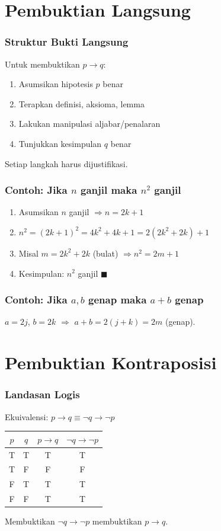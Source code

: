 \documentclass[handout]{beamer}
\theoremstyle{definition}
\theoremstyle{example}
\begin{document}
\section{Pembuktian Langsung}

\begin{frame}
\frametitle{Struktur Bukti Langsung}
Untuk membuktikan $p \to q$:
\begin{enumerate}
  \item Asumsikan hipotesis $p$ benar
  \item Terapkan definisi, aksioma, lemma
  \item Lakukan manipulasi aljabar/penalaran
  \item Tunjukkan kesimpulan $q$ benar
\end{enumerate}
Setiap langkah harus dijustifikasi.
\end{frame}

\begin{frame}
\frametitle{Contoh: Jika $n$ ganjil maka $n^2$ ganjil}
\begin{enumerate}
  \item Asumsikan $n$ ganjil $\Rightarrow n = 2k + 1$
  \item $n^2 = (2k+1)^2 = 4k^2 + 4k + 1 = 2(2k^2+2k) + 1$
  \item Misal $m = 2k^2 + 2k$ (bulat) $\Rightarrow n^2 = 2m + 1$
  \item Kesimpulan: $n^2$ ganjil $\blacksquare$
\end{enumerate}
\end{frame}

\begin{frame}
\frametitle{Contoh: Jika $a,b$ genap maka $a+b$ genap}
$a = 2j$, $b = 2k$ $\Rightarrow$ $a+b = 2(j+k) = 2m$ (genap).
\end{frame}

\section{Pembuktian Kontraposisi}

\begin{frame}
\frametitle{Landasan Logis}
Ekuivalensi: $p \to q \equiv \neg q \to \neg p$
\begin{center}
\small
\begin{tabular}{|c|c||c|c|}
\hline
$p$ & $q$ & $p \to q$ & $\neg q \to \neg p$ \\ \hline
T & T & T & T \\ \hline
T & F & F & F \\ \hline
F & T & T & T \\ \hline
F & F & T & T \\ \hline
\end{tabular}
\end{center}
Membuktikan $\neg q \to \neg p$ membuktikan $p \to q$.
\end{frame}
\end{document}
